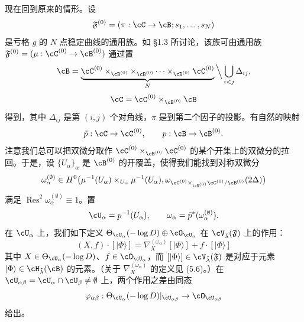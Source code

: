 现在回到原来的情形。设
\[
 \mathfrak F^{(0)}=(\pi:\cC\to\cB;s_1,\dots,s_N)
\]
是亏格 $g$ 的 $N$ 点稳定曲线的通用族。如 §1.3 所讨论，该族可由通用族 $\mathfrak F^{(0)}=(\mu:\cC^{(0)}\to\cB^{(0)})$ 通过置
\[
 \cB=\underbrace{\cC^{(0)}\times_{\cB^{(0)}}\times_{\cB^{(0)}}\cdots
 \times_{\cB^{(0)}}\cC^{(0)}}_{N}\Big\backslash\bigcup_{i<j}\Delta_{ij},
\]
\[
 \cC=\cC^{(0)}\times_{\cB^{(0)}}\cB
\]
得到，其中 $\Delta_{ij}$ 是第 $(i,j)$ 个对角线，$\pi$ 是到第二个因子的投影。有自然的映射
\[
 \tilde p:\cC\to\cC^{(0)},\qquad p:\cB\to\cB^{(0)}.
\]
注意我们总可以把双微分取作 $\cC^{(0)}\times_{\cB^{(0)}}\cC^{(0)}$ 的某个开集上的双微分的拉回。于是，设 $\{U_\alpha\}_\alpha$ 是 $\cB^{(0)}$ 的开覆盖，使得我们能找到对称双微分
\[
 \omega^{(\emptyset)}_\alpha\in H^0\big(\mu^{-1}(U_\alpha)\times_{U_\alpha}\mu^{-1}(U_\alpha),
 \omega_{\cC^{(0)}\times_{\cB^{(0)}}\cC^{(0)}/\cB^{(0)}}(2\Delta)\big)
\]
满足 $\operatorname{Res}^2\omega^{(\emptyset)}_\alpha\equiv1$。置
\[
 \cU_\alpha=p^{-1}(U_\alpha),\qquad \omega_\alpha=\tilde p^*(\omega^{(\emptyset)}_\alpha).
\]
在 $\cU_\alpha$ 上，我们如下定义 $\Theta_{\cU_\alpha}(-\log D)\oplus\cO_{\cU_\alpha}$ 在 $\cV_{\tilde\lambda}(\mathfrak F)$ 上的作用：
\begin{equation}
 (X,f)\cdot[|\Phi\rangle]=\nabla^{(\omega_\alpha)}_X[|\Phi\rangle]+f\cdot[|\Phi\rangle] \tag{5.16}
\end{equation}
其中 $X\in\Theta_{\cU_\alpha}(-\log D)$、$f\in\cO_{\cU_\alpha}$，而 $[|\Phi\rangle]\in\cV_{\tilde\lambda}(\mathfrak F)$ 是对应于元素 $|\Phi\rangle\in\cH_{\tilde\lambda}(\cB)$ 的元素。（关于 $\nabla^{(\omega_\alpha)}_X$ 的定义见 (5.6)。）在 $\cU_{\alpha\beta}=\cU_\alpha\cap\cU_\beta\ne\emptyset$ 上，两个作用之差由同态
\[
 \varphi_{\alpha\beta}:\Theta_{\cU_\alpha}(-\log D)|_{\cU_{\alpha\beta}}
 \to\cO_{\cU_{\alpha\beta}}
\]
给出。



